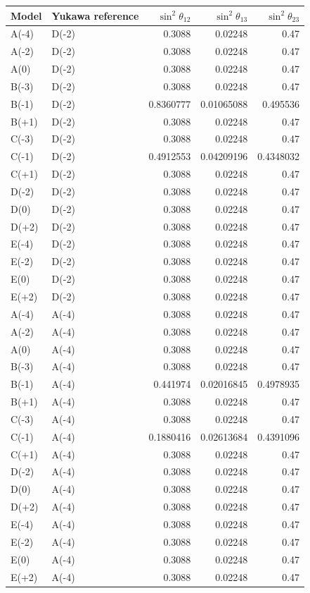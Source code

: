 \begin{tabular}{llrrr}
\hline
Model & Yukawa reference & $\sin^2\theta_{12}$ & $\sin^2\theta_{13}$ & $\sin^2\theta_{23}$ \\
\hline
A(-4) & D(-2) & 0.3088 & 0.02248 & 0.47 \\
A(-2) & D(-2) & 0.3088 & 0.02248 & 0.47 \\
A(0) & D(-2) & 0.3088 & 0.02248 & 0.47 \\
B(-3) & D(-2) & 0.3088 & 0.02248 & 0.47 \\
B(-1) & D(-2) & 0.8360777 & 0.01065088 & 0.495536 \\
B(+1) & D(-2) & 0.3088 & 0.02248 & 0.47 \\
C(-3) & D(-2) & 0.3088 & 0.02248 & 0.47 \\
C(-1) & D(-2) & 0.4912553 & 0.04209196 & 0.4348032 \\
C(+1) & D(-2) & 0.3088 & 0.02248 & 0.47 \\
D(-2) & D(-2) & 0.3088 & 0.02248 & 0.47 \\
D(0) & D(-2) & 0.3088 & 0.02248 & 0.47 \\
D(+2) & D(-2) & 0.3088 & 0.02248 & 0.47 \\
E(-4) & D(-2) & 0.3088 & 0.02248 & 0.47 \\
E(-2) & D(-2) & 0.3088 & 0.02248 & 0.47 \\
E(0) & D(-2) & 0.3088 & 0.02248 & 0.47 \\
E(+2) & D(-2) & 0.3088 & 0.02248 & 0.47 \\
A(-4) & A(-4) & 0.3088 & 0.02248 & 0.47 \\
A(-2) & A(-4) & 0.3088 & 0.02248 & 0.47 \\
A(0) & A(-4) & 0.3088 & 0.02248 & 0.47 \\
B(-3) & A(-4) & 0.3088 & 0.02248 & 0.47 \\
B(-1) & A(-4) & 0.441974 & 0.02016845 & 0.4978935 \\
B(+1) & A(-4) & 0.3088 & 0.02248 & 0.47 \\
C(-3) & A(-4) & 0.3088 & 0.02248 & 0.47 \\
C(-1) & A(-4) & 0.1880416 & 0.02613684 & 0.4391096 \\
C(+1) & A(-4) & 0.3088 & 0.02248 & 0.47 \\
D(-2) & A(-4) & 0.3088 & 0.02248 & 0.47 \\
D(0) & A(-4) & 0.3088 & 0.02248 & 0.47 \\
D(+2) & A(-4) & 0.3088 & 0.02248 & 0.47 \\
E(-4) & A(-4) & 0.3088 & 0.02248 & 0.47 \\
E(-2) & A(-4) & 0.3088 & 0.02248 & 0.47 \\
E(0) & A(-4) & 0.3088 & 0.02248 & 0.47 \\
E(+2) & A(-4) & 0.3088 & 0.02248 & 0.47 \\
\hline
\end{tabular}
